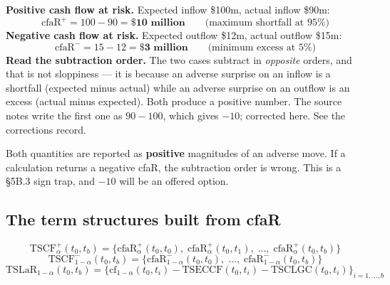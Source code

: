 \begin{lrexbox}
\textbf{Positive cash flow at risk.} Expected inflow \$100m, actual inflow \$90m:
\[ \text{cfaR}^{+} = 100 - 90 = \mathbf{\$10\text{ million}} \qquad \text{(maximum shortfall at 95\%)} \]
\textbf{Negative cash flow at risk.} Expected outflow \$12m, actual outflow \$15m:
\[ \text{cfaR}^{-} = 15 - 12 = \mathbf{\$3\text{ million}} \qquad \text{(minimum excess at 5\%)} \]
\tcblower
\textbf{Read the subtraction order.} The two cases subtract in \emph{opposite} orders, and that is not sloppiness --- it is because an adverse surprise on an inflow is a shortfall (expected minus actual) while an adverse surprise on an outflow is an excess (actual minus expected). Both produce a positive number. The source notes write the first one as $90 - 100$, which gives $-10$; corrected here. See the corrections record.
\end{lrexbox}

\begin{lrtrapbox}
Both quantities are reported as \textbf{positive} magnitudes of an adverse move. If a calculation returns a negative cfaR, the subtraction order is wrong. This is a \S5B.3 sign trap, and $-10$ will be an offered option.
\end{lrtrapbox}

\subsection{The term structures built from cfaR}

\begin{lrfmlbox}
\[ \text{TSCF}^{+}_{\alpha}(t_0,t_b) = \bigl\{ \text{cfaR}^{+}_{\alpha}(t_0,t_0),\; \text{cfaR}^{+}_{\alpha}(t_0,t_1),\;\ldots,\; \text{cfaR}^{+}_{\alpha}(t_0,t_b) \bigr\} \]
\[ \text{TSCF}^{-}_{1-\alpha}(t_0,t_b) = \bigl\{ \text{cfaR}^{-}_{1-\alpha}(t_0,t_0),\; \ldots,\; \text{cfaR}^{-}_{1-\alpha}(t_0,t_b) \bigr\} \]
\[ \text{TSLaR}_{1-\alpha}(t_0,t_b) = \bigl\{ \text{cf}_{1-\alpha}(t_0,t_i) - \text{TSECCF}(t_0,t_i) - \text{TSCLGC}(t_0,t_i) \bigr\}_{i=1,\ldots,b} \]
\end{lrfmlbox}

